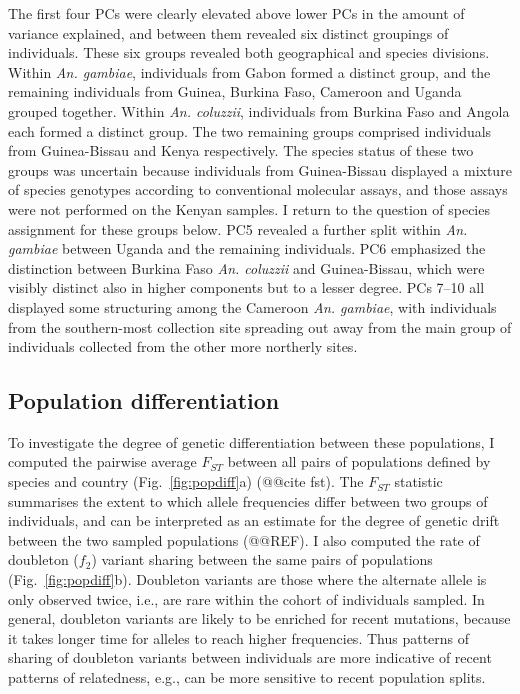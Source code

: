 \documentclass[a4paper,11pt,abstracton,hidelinks]{scrartcl}
\begin{document}
The first four PCs were clearly elevated above lower PCs in the amount of variance explained, and between them revealed six distinct groupings of individuals.
%
These six groups revealed both geographical and species divisions.
%
Within \textit{An. gambiae}, individuals from Gabon formed a distinct group, and the remaining individuals from Guinea, Burkina Faso, Cameroon and Uganda grouped together.
%
Within \textit{An. coluzzii}, individuals from Burkina Faso and Angola each formed a distinct group.
%
The two remaining groups comprised individuals from Guinea-Bissau and Kenya respectively.
%
The species status of these two groups was uncertain because individuals from Guinea-Bissau displayed a mixture of species genotypes according to conventional molecular assays, and those assays were not performed on the Kenyan samples.
%
I return to the question of species assignment for these groups below.
%
PC5 revealed a further split within \textit{An. gambiae} between Uganda and the remaining individuals.
%
PC6 emphasized the distinction between Burkina Faso \textit{An. coluzzii} and Guinea-Bissau, which were visibly distinct also in higher components but to a lesser degree.
%
PCs 7--10 all displayed some structuring among the Cameroon \textit{An. gambiae}, with individuals from the southern-most collection site spreading out away from the main group of individuals collected from the other more northerly sites.
%


\subsection{Population differentiation}\label{subsec:pop-diff}


To investigate the degree of genetic differentiation between these populations, I computed the pairwise average $F_{ST}$ between all pairs of populations defined by species and country (Fig.~\ref{fig:popdiff}a) (@@cite fst).
%
The $F_{ST}$ statistic summarises the extent to which allele frequencies differ between two groups of individuals, and can be interpreted as an estimate for the degree of genetic drift between the two sampled populations (@@REF).
%
I also computed the rate of doubleton ($f_{2}$) variant sharing between the same pairs of populations (Fig.~\ref{fig:popdiff}b).
%
Doubleton variants are those where the alternate allele is only observed twice, i.e., are rare within the cohort of individuals sampled.
%
In general, doubleton variants are likely to be enriched for recent mutations, because it takes longer time for alleles to reach higher frequencies.
%
Thus patterns of sharing of doubleton variants between individuals are more indicative of recent patterns of relatedness, e.g., can be more sensitive to recent population splits.
%
\end{document}
